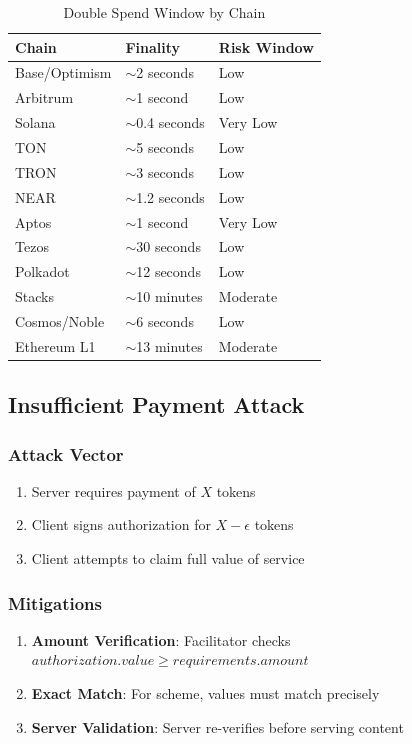 \begin{table}[htbp]
\centering
\caption{Double Spend Window by Chain}
\label{tab:double-spend-window}
\begin{tabular}{lll}
\toprule
\textbf{Chain} & \textbf{Finality} & \textbf{Risk Window} \\
\midrule
Base/Optimism & $\sim$2 seconds & Low \\
Arbitrum & $\sim$1 second & Low \\
Solana & $\sim$0.4 seconds & Very Low \\
TON & $\sim$5 seconds & Low \\
TRON & $\sim$3 seconds & Low \\
NEAR & $\sim$1.2 seconds & Low \\
Aptos & $\sim$1 second & Very Low \\
Tezos & $\sim$30 seconds & Low \\
Polkadot & $\sim$12 seconds & Low \\
Stacks & $\sim$10 minutes & Moderate \\
Cosmos/Noble & $\sim$6 seconds & Low \\
Ethereum L1 & $\sim$13 minutes & Moderate \\
\bottomrule
\end{tabular}
\end{table}

\subsection{Insufficient Payment Attack}

\subsubsection{Attack Vector}

\begin{enumerate}
    \item Server requires payment of $X$ tokens
    \item Client signs authorization for $X - \epsilon$ tokens
    \item Client attempts to claim full value of service
\end{enumerate}

\subsubsection{Mitigations}

\begin{enumerate}
    \item \textbf{Amount Verification}: Facilitator checks $authorization.value \geq requirements.amount$
    \item \textbf{Exact Match}: For  scheme, values must match precisely
    \item \textbf{Server Validation}: Server re-verifies before serving content
\end{enumerate}

